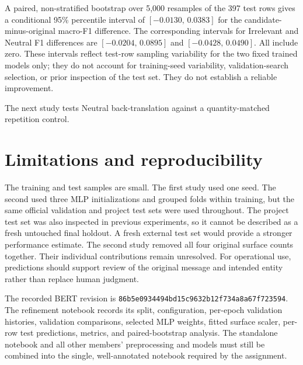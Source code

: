 A paired, non-stratified bootstrap over 5,000 resamples of the 397 test rows gives a conditional 95\% percentile interval of $[-0.0130,\,0.0383]$ for the candidate-minus-original macro-F1 difference. The corresponding intervals for Irrelevant and Neutral F1 differences are $[-0.0204,\,0.0895]$ and $[-0.0428,\,0.0490]$. All include zero. These intervals reflect test-row sampling variability for the two fixed trained models only; they do not account for training-seed variability, validation-search selection, or prior inspection of the test set. They do not establish a reliable improvement.

The next study tests Neutral back-translation against a quantity-matched repetition control.



\section{Limitations and reproducibility}
The training and test samples are small. The first study used one seed. The second used three MLP initializations and grouped folds within training, but the same official validation and project test sets were used throughout. The project test set was also inspected in previous experiments, so it cannot be described as a fresh untouched final holdout. A fresh external test set would provide a stronger performance estimate. The second study removed all four original surface counts together. Their individual contributions remain unresolved. For operational use, predictions should support review of the original message and intended entity rather than replace human judgment.

The recorded BERT revision is \texttt{86b5e0934494bd15c9632b12f734a8a67f723594}. The refinement notebook records its split, configuration, per-epoch validation histories, validation comparisons, selected MLP weights, fitted surface scaler, per-row test predictions, metrics, and paired-bootstrap analysis. The standalone notebook and all other members' preprocessing and models must still be combined into the single, well-annotated notebook required by the assignment.
